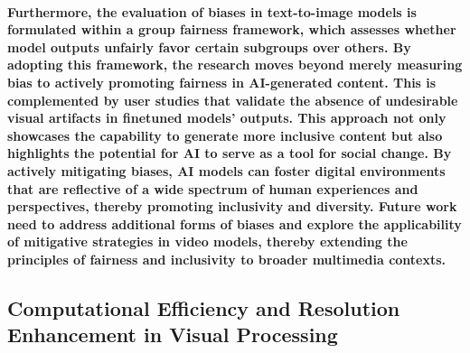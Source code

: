 \documentclass[11pt,a4paper,oneside]{report}
\begin{document}
\paragraph{Furthermore, the evaluation of biases in text-to-image models is formulated within a group fairness framework, which assesses whether model outputs unfairly favor certain subgroups over others. 
By adopting this framework, the research moves beyond merely measuring bias to actively promoting fairness in AI-generated content. 
This is complemented by user studies that validate the absence of undesirable visual artifacts in finetuned models' outputs.
This approach not only showcases the capability to generate more inclusive content but also highlights the potential for AI to serve as a tool for social change. 
By actively mitigating biases, AI models can foster digital environments that are reflective of a wide spectrum of human experiences and perspectives, thereby promoting inclusivity and diversity.
Future work need to address additional forms of biases and explore the applicability of mitigative strategies in video models, thereby extending the principles of fairness and inclusivity to broader multimedia contexts.
}


\subsection{Computational Efficiency and Resolution Enhancement in Visual Processing}
\end{document}
